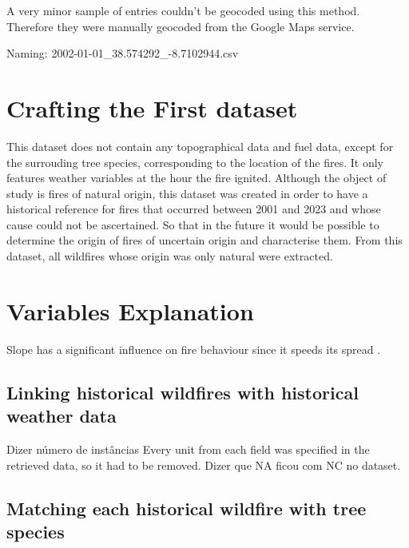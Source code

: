 A very minor sample of entries couldn't be geocoded using this method. Therefore they were manually geocoded from the Google Maps service. 







Naming: 2002-01-01\_38.574292\_-8.7102944.csv


\section{Crafting the First dataset}
This dataset does not contain any topographical data and fuel data, except for the surrouding tree species, corresponding to the location of the fires. It only features weather variables at the hour the fire ignited. Although the object of study is fires of natural origin, this dataset was created in order to have a historical reference for fires that occurred between 2001 and 2023 and whose cause could not be ascertained. So that in the future it would be possible to determine the origin of fires of uncertain origin and characterise them. From this dataset, all wildfires whose origin was only natural were extracted.



\section{Variables Explanation}
Slope has a significant influence on fire behaviour since it speeds its spread \cite{Marques2011}.














\subsection{Linking historical wildfires with historical weather data}
Dizer número de instâncias
Every unit from each field was specified in the retrieved data, so it had to be removed.
Dizer que NA ficou com NC no dataset.




\subsection{Matching each historical wildfire with tree species}
\label{tree_species_wildfires}



